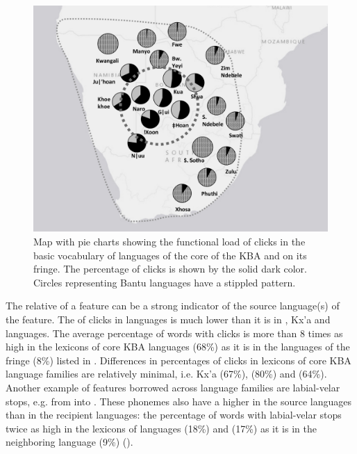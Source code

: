 \documentclass[output=paper,newtxmath,modfonts,nonflat,draftmode]{langsci/langscibook}
\begin{document}
\begin{figure}
\includegraphics[height=.35\textheight]{figures/sands-fig3.png}
\caption{Map with pie charts showing the functional load of clicks in the basic vocabulary of languages of the core of the KBA and on its fringe. The percentage of clicks is shown by the solid dark color. Circles representing Bantu languages have a stippled pattern.} 
\label{fig:sands:3}
\end{figure}

\clearpage
The relative  of a feature can be a strong indicator of the source language(s) of the feature. The  of clicks in  languages is much lower than it is in , Kx'a and  languages. The average percentage of words with clicks is more than 8 times as high in the lexicons of core KBA languages (68\%) as it is in the languages of the fringe (8\%) listed in . Differences in percentages of clicks in lexicons of core KBA language families are relatively minimal, i.e. Kx'a (67\%),  (80\%) and  (64\%). Another example of features borrowed across language families are labial-velar stops, e.g. from  into . These phonemes also have a higher  in the source languages than in the recipient languages: the percentage of words with labial-velar stops twice as high in the lexicons of  languages  (18\%) and  (17\%) as it is in the neighboring  language  (9\%) (\citealt{BostoenDonzo2013}). 
\end{document}
